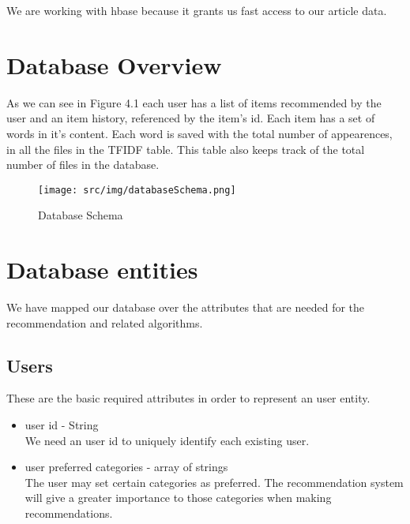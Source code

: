 We are working with hbase because it grants us fast access to our article data.

\section{Database Overview}
\label{sec:users}
As we can see in Figure 4.1 each user has a list of items recommended by the user and an item history, referenced by the item's id. Each item has a set of words in it's content. Each word is saved with the total number of appearences, in all the files in the TFIDF table. This table also keeps track of the total number of files in the database.
\begin{figure}[h]
\caption{Database Schema}
\texttt{[image: src/img/databaseSchema.png]}
\end{figure}

\section{Database entities}
\label{sec:database-entities}

We have mapped our database over the attributes that are needed for the recommendation and related algorithms.


\subsection{Users}
\label{sec:users}
These are the basic required attributes in order to represent an user entity.
\begin{itemize}
	\item user id - String
		\\ We need an user id to uniquely identify each existing user.
	\item user preferred categories - array of strings
		\\ The user may set certain categories as preferred. 
		The recommendation system will give a greater importance to those categories when making recommendations.
\end{itemize}

